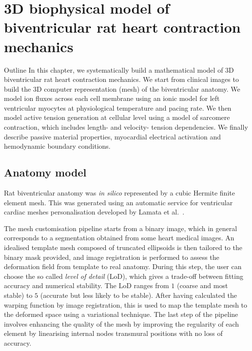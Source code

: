\chapter{3D biophysical model of biventricular rat heart contraction 
mechanics}\label{cha:chapter2}
%
%
%
\begin{remark}{Outline}
    In this chapter, we systematically build a mathematical model of $3$D biventricular rat heart contraction mechanics. We start from clinical images to build the $3$D computer representation (mesh) of the biventricular anatomy. We model ion fluxes across each cell membrane using an ionic model for left ventricular myocytes at physiological temperature and pacing rate. We then model active tension generation at cellular level using a model of sarcomere contraction, which includes length- and velocity- tension dependencies. We finally describe passive material properties, myocardial electrical activation and hemodynamic boundary conditions.
\end{remark}


%
%
%
\section{Anatomy model}\label{sec:ch2anatomy}
Rat biventricular anatomy was \textit{in silico} represented by a cubic Hermite finite element mesh. This was generated using an automatic service for ventricular cardiac meshes personalisation developed by Lamata et al.~\cite{Lamata:2011, Lamata:2014}.

\vspace{0.2cm}
The mesh customisation pipeline starts from a binary image, which in general corresponds to a segmentation obtained from some heart medical images. An idealised template mesh composed of truncated ellipsoids is then tailored to the binary mask provided, and image registration is performed to assess the deformation field from template to real anatomy. During this step, the user can choose the so called \textit{level of detail} (\acs{LoD}), which gives a trade-off between fitting accuracy and numerical stability. The LoD ranges from $1$ (coarse and most stable) to $5$ (accurate but less likely to be stable). After having calculated the warping function by image registration, this is used to map the template mesh to the deformed space using a variational technique. The last step of the pipeline involves enhancing the quality of the mesh by improving the regularity of each element by linearising internal nodes transmural positions with no loss of accuracy.

